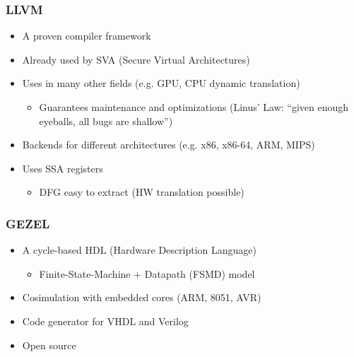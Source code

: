 \documentclass{beamer}
\begin{document}
\begin{frame}
  \frametitle{LLVM}

  \begin{itemize}
  \item A proven compiler framework
  \item Already used by SVA (Secure Virtual Architectures)
  \item Uses in many other fields (e.g. GPU, CPU dynamic translation)
    \begin{itemize}
    \item Guarantees maintenance and optimizations (Linus' Law: ``given enough eyeballs, all bugs are shallow'')
    \end{itemize}
  \item Backends for different architectures (e.g. x86, x86-64, ARM, MIPS)
  \item Uses SSA registers
    \begin{itemize}
    \item DFG easy to extract (HW translation possible)
    \end{itemize}
  \end{itemize}
\end{frame}

\begin{frame}
  \frametitle{GEZEL}
  
  \begin{itemize}
  \item A cycle-based HDL (Hardware Description Language)
    \begin{itemize}
    \item Finite-State-Machine + Datapath (FSMD) model
    \end{itemize}
  \item Cosimulation with embedded cores (ARM, 8051, AVR)
  \item Code generator for VHDL and Verilog
  \item Open source
  \end{itemize}
\end{frame}
\end{document}
